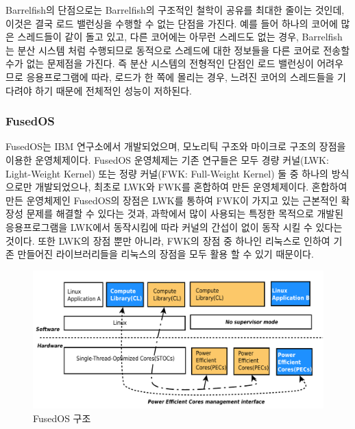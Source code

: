 Barrelfish의 단점으로는 Barrelfish의 구조적인 철학이 공유를 최대한 줄이는 것인데, 
이것은 결국 로드 밸런싱을 수행할 수 없는 단점을 가진다. 
예를 들어 하나의 코어에 많은 스레드들이 같이 돌고 있고, 다른 코어에는 아무런 
스레드도 없는 경우, Barrelfish는 분산 시스템 처럼 수행되므로 동적으로 스레드에 대한 정보들을 
다른 코어로 전송할 수가 없는 문제점을 가진다.
즉 분산 시스템의 전형적인 단점인 로드 밸런싱이 어려우므로 응용프로그램에 따라,
로드가 한 쪽에 몰리는 경우, 느려진 코어의 스레드들을 기다려야 하기 때문에 전체적인 
성능이 저하된다.  

\subsubsection{FusedOS}
FusedOS는 IBM 연구소에서 개발되었으며, 모노리틱 구조와 마이크로 구조의 장점을 이용한 운영체제이다.
FusedOS 운영체제는 기존 연구들은 모두 경량 커널(LWK: Light-Weight Kernel) 또는 정량 커널(FWK:
Full-Weight Kernel) 둘 중 하나의 방식으로만 개발되었으나, 최초로 LWK와 FWK를 
혼합하여 만든 운영체제이다.
혼합하여 만든 운영체제인 FusedOS의 장점은 LWK를 통하여 FWK이 가지고 있는 근본적인 확장성 
문제를 해결할 수 있다는 것과, 과학에서 많이 사용되는 특정한 목적으로 개발된 응용프로그램을 
LWK에서 동작시킴에 따라 커널의 간섭이 없이 동작 시킬 수 있다는 것이다. 
또한 LWK의 장점 뿐만 아니라, FWK의 장점 중 하나인 리눅스로 인하여 기존 만들어진 라이브러리들을 
리눅스의 장점을 모두 활용 할 수 있기 때문이다.
 
\begin{figure}[h!]
    \centering
    \includegraphics[width=1\textwidth]{fig/fusedos/fusedos}
    \caption{FusedOS 구조}
  \label{fig:FusedOS}
\end{figure}

